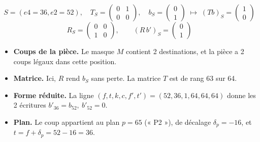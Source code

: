 \[ S = (e4=36, e2=52),\quad T_S = \begin{pmatrix}0 & 1 \\ 0 & 0\end{pmatrix},\quad b_S = \begin{pmatrix}0 \\ 1\end{pmatrix}\;\longmapsto\; (Tb)_S =\begin{pmatrix}1 \\ 0\end{pmatrix} \]
\[ R_S = \begin{pmatrix}0 & 0 \\ 1 & 0\end{pmatrix},\qquad (R\,b')_S = \begin{pmatrix}0 \\ 1\end{pmatrix} \]
\begin{itemize}
\item \textbf{Coups de la pièce.} Le masque $M$ contient 2 destinations, et la pièce a 2 coups légaux dans cette position.
\item \textbf{Matrice.} Ici, $R$ rend $b_S$ sans perte. La matrice $T$ est de rang 63 sur 64.
\item \textbf{Forme réduite.} La ligne $(f, t, k, c, f', t') = (52, 36, 1, 64, 64, 64)$ donne les 2 écritures $b'_{36} = b_{52},\ b'_{52} = 0$.
\item \textbf{Plan.} Le coup appartient au plan $p = 65$ (« P2 »), de décalage $\delta_p = -16$, et $t = f + \delta_p = 52 -16 = 36$.
\end{itemize}
